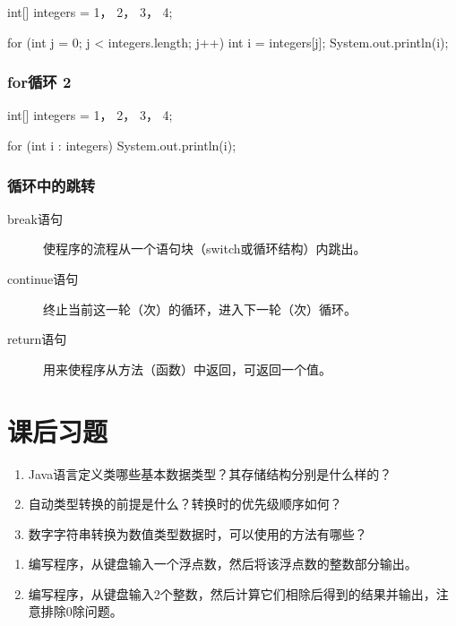 \begin{javaCode}
  int[] integers = {1， 2， 3， 4};
  
  for (int j = 0; j < integers.length; j++) {
    int i = integers[j];
    System.out.println(i);
  } 
\end{javaCode}

\subsubsection{for循环 2}

\begin{javaCode}
  int[] integers = {1， 2， 3， 4};

  for (int i : integers) {
    System.out.println(i);
  }
\end{javaCode}


\subsubsection{循环中的跳转}

\begin{description}
\item[break语句] 使程序的流程从一个语句块（switch或循环结构）内跳出。
\item[continue语句] 终止当前这一轮（次）的循环，进入下一轮（次）循环。
\item[return语句] 用来使程序从方法（函数）中返回，可返回一个值。
\end{description}


\section{课后习题}


\begin{enumerate}
\item Java语言定义类哪些基本数据类型？其存储结构分别是什么样的？
\item 自动类型转换的前提是什么？转换时的优先级顺序如何？
\item 数字字符串转换为数值类型数据时，可以使用的方法有哪些？
\end{enumerate}


\begin{enumerate}
\item 编写程序，从键盘输入一个浮点数，然后将该浮点数的整数部分输出。
\item 编写程序，从键盘输入2个整数，然后计算它们相除后得到的结果并输出，注意排除0除问题。
\end{enumerate}
